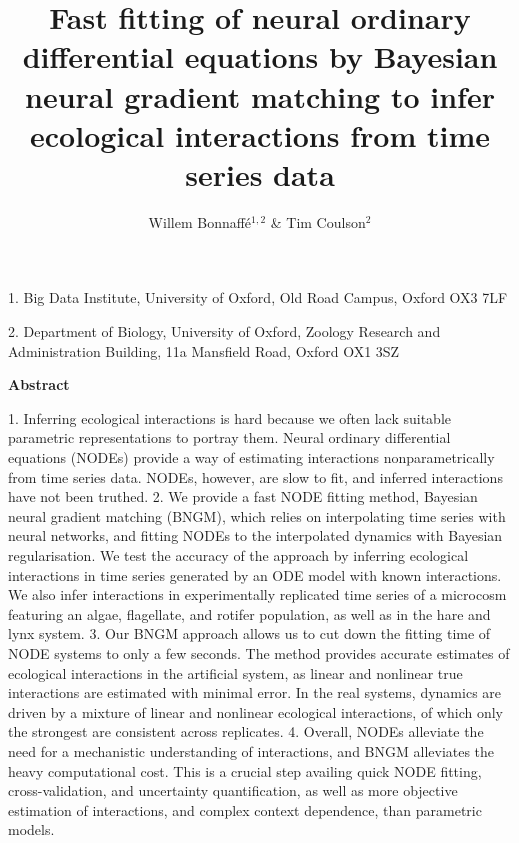 \documentclass[11pt, oneside]{article}
\title{Fast fitting of neural ordinary differential equations by Bayesian neural gradient matching to infer ecological interactions from time series data}
\author{Willem Bonnaff\'e$^{1,2}$ \& Tim Coulson$^2$}
\date{}
\begin{document}
\maketitle
\vspace{-0.5cm}

1. Big Data Institute, University of Oxford, Old Road Campus, Oxford OX3 7LF 

2. Department of Biology, University of Oxford, Zoology Research and Administration Building, 11a Mansfield Road, Oxford OX1 3SZ 


\begin{center}
\textbf{Abstract}
\end{center}

1. Inferring ecological interactions is hard because we often lack suitable parametric representations to portray them.
Neural ordinary differential equations (NODEs) provide a way of estimating interactions nonparametrically from time series data. %
NODEs, however, are slow to fit, and inferred interactions have not been truthed.
%
2. We provide a fast NODE fitting method, Bayesian neural gradient matching (BNGM), which relies on interpolating time series with neural networks, and fitting NODEs to the interpolated dynamics with Bayesian regularisation.
We test the accuracy of the approach by inferring ecological interactions in time series generated by an ODE model with known interactions. 
We also infer interactions in experimentally replicated time series of a microcosm featuring an algae, flagellate, and rotifer population, as well as in the hare and lynx system.
%
3. Our BNGM approach allows us to cut down the fitting time of NODE systems to only a few seconds.
The method provides accurate estimates of ecological interactions in the artificial system, as linear and nonlinear true interactions are estimated with minimal error.
In the real systems, dynamics are driven by a mixture of linear and nonlinear ecological interactions, of which only the strongest are consistent across replicates.
%
4. Overall, NODEs alleviate the need for a mechanistic understanding of interactions, and BNGM alleviates the heavy computational cost. 
This is a crucial step availing quick NODE fitting, cross-validation, and uncertainty quantification, as well as more objective estimation of interactions, and complex context dependence, than parametric models. 

\vspace{0.5cm}
\end{document}
